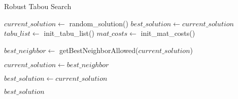 \documentclass{article}
\begin{document}
	
	
	\begin{algorithm}
		\caption{Robust Tabou Search}
		\label{array-sum}
		\begin{algorithmic}[1]
			\State $current\_solution \gets$ {random\_solution()}
			\State $best\_solution \gets current\_solution$
			\State $tabu\_list \gets$ {init\_tabu\_list()}
			\State $mat\_costs \gets$ {init\_mat\_costs()}
			
			\State $best\_neighbor \gets$ {getBestNeighborAllowed($current\_solution$)}
			
				\State $current\_solution \gets best\_neighbor$
				
					\State $best\_solution \gets current\_solution$
				\EndIf
				
			\Else
			\EndIf
			
			\EndFor
			
			\State 
			\Return $best\_solution$
			\EndFunction
		\end{algorithmic}
	\end{algorithm}
	
\end{document}
